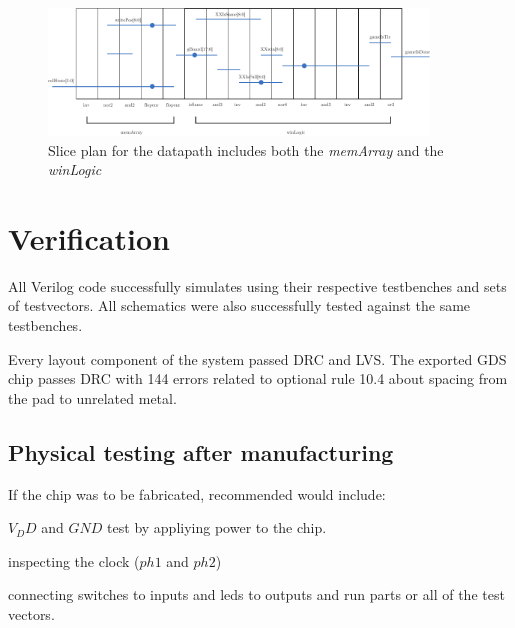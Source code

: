 \documentclass[]{article}
\begin{document}
\begin{figure}
\centering
\includegraphics[width=0.9\textwidth]{sliceplan.pdf}
\caption{Slice plan for the datapath includes both the \emph{memArray} and the \emph{winLogic}}
\label{fig:sliceplan}
\end{figure}



\section{Verification}
\label{sec:verification}

All Verilog code successfully simulates using their respective testbenches and sets of testvectors. All schematics were also successfully tested against the same testbenches.

Every layout component of the system passed DRC and LVS. The exported GDS chip passes DRC with 144 errors related to optional rule 10.4 about spacing from the pad to unrelated metal. 

\subsection{Physical testing after manufacturing}
If the chip was to be fabricated, recommended would include:
\begin{enum}
\item $V_DD$ and $GND$ test by appliying power to the chip.
\item inspecting the clock ($ph1$ and $ph2$)
\item connecting switches to inputs and leds to outputs and run parts or all of the test vectors.
\end{enum}

\end{document}
